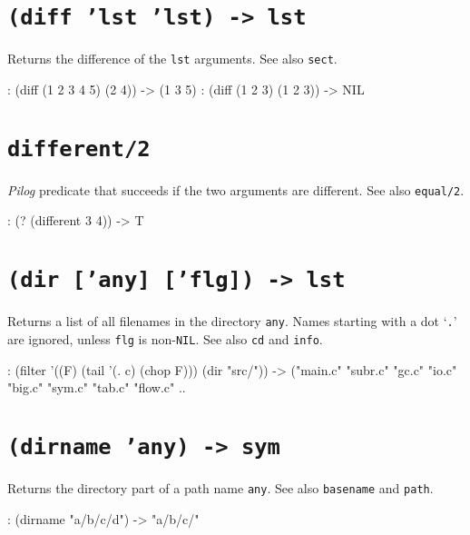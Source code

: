 { 
\section*{\texttt{(diff 'lst 'lst) -> lst}}
\label{sec:func-ref-D-(diff 'lst 'lst) -> lst}


Returns the difference of the \texttt{lst} arguments. See also \texttt{sect}.


\begin{wideverbatim}
: (diff (1 2 3 4 5) (2 4))
-> (1 3 5)
: (diff (1 2 3) (1 2 3))
-> NIL
\end{wideverbatim}

 
\section*{\texttt{different/2}}
\label{sec:func-ref-D-different/2}


\emph{Pilog} predicate that succeeds if the two arguments
are different. See also \texttt{equal/2}.


\begin{wideverbatim}
: (? (different 3 4))
-> T
\end{wideverbatim}

 
\section*{\texttt{(dir ['any] ['flg]) -> lst}}
\label{sec:func-ref-D-(dir ['any] ['flg]) -> lst}


Returns a list of all filenames in the directory \texttt{any}. Names
starting with a dot `\texttt{.}' are ignored, unless \texttt{flg} is
non-\texttt{NIL}. See also \texttt{cd} and \texttt{info}.


\begin{wideverbatim}
: (filter '((F) (tail '(. c) (chop F))) (dir "src/"))
-> ("main.c" "subr.c" "gc.c" "io.c" "big.c" "sym.c" "tab.c" "flow.c" ..
\end{wideverbatim}

 
\section*{\texttt{(dirname 'any) -> sym}}
\label{sec:func-ref-D-(dirname 'any) -> sym}


Returns the directory part of a path name \texttt{any}. See also \texttt{basename} and
\texttt{path}.


\begin{wideverbatim}
: (dirname "a/b/c/d")
-> "a/b/c/"
\end{wideverbatim}

}
